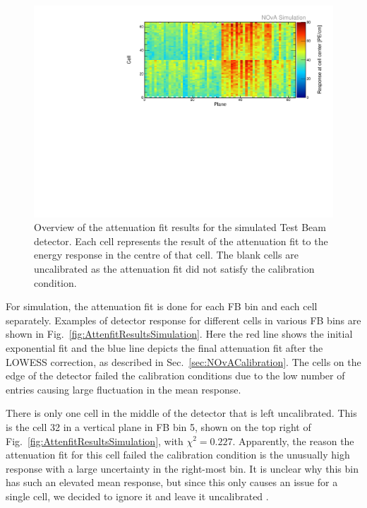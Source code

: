 \begin{figure}[h]
\centering
\includegraphics[width=\textwidth]{Plots/TBCalibration/CellResponseAtCentre_Prod4DataBasedSim_Limited_NOvAPlotStyle.pdf}
\caption[Map of fitted response at cell centre for simulation]{Overview of the attenuation fit results for the simulated Test Beam detector. Each cell represents the result of the attenuation fit to the energy response in the centre of that cell. The blank cells are uncalibrated as the attenuation fit did not satisfy the calibration condition.}
\label{fig:CellCentreResponseSim}
\end{figure}

For simulation, the attenuation fit is done for each \gls{FB} bin and each cell separately. Examples of detector response for different cells in various \gls{FB} bins are shown in Fig.~\ref{fig:AttenfitResultsSimulation}. Here the red line shows the initial exponential fit and the blue line depicts the final attenuation fit after the \gls{LOWESS} correction, as described in Sec.~\ref{sec:NOvACalibration}. The cells on the edge of the detector failed the calibration conditions due to the low number of entries causing large fluctuation in the mean response.

There is only one cell in the middle of the detector that is left uncalibrated. This is the cell 32 in a vertical plane in \gls{FB} bin 5, shown on the top right of Fig.~\ref{fig:AttenfitResultsSimulation}, with $\chi^2=0.227$. Apparently, the reason the attenuation fit for this cell failed the calibration condition is the unusually high response with a large uncertainty in the right-most bin. It is unclear why this bin has such an elevated mean response, but since this only causes an issue for a single cell, we decided to ignore it and leave it uncalibrated .

